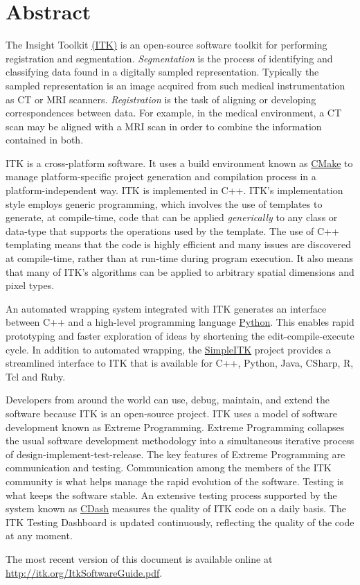 \chapter*{Abstract}
\noindent
The Insight Toolkit \href{http://itk.org}{(ITK)} is an open-source
software toolkit for performing registration and
segmentation. \emph{Segmentation} is the process of identifying and
classifying data found in a digitally sampled
representation. Typically the sampled representation is an image
acquired from such medical instrumentation as CT or MRI
scanners. \emph{Registration} is the task of aligning or developing
correspondences between data. For example, in the medical environment,
a CT scan may be aligned with a MRI scan in order to combine the
information contained in both.

ITK is a cross-platform software. It uses a build environment known as
\href{http://cmake.org}{CMake} to manage platform-specific project
generation and compilation process in a platform-independent way. ITK is
implemented in C++. ITK's implementation style employs generic programming,
which involves the use of templates to generate, at compile-time, code that can
be applied \emph{generically} to any class or data-type that supports the
operations used by the template. The use of C++ templating means that the code
is highly efficient and many issues are discovered at compile-time, rather than
at run-time during program execution. It also means that many of ITK's
algorithms can be applied to arbitrary spatial dimensions and pixel types.

An automated wrapping system integrated with ITK generates an interface between
C++ and a high-level programming language \href{http://www.python.org}{Python}.
This enables rapid prototyping and faster exploration of ideas by shortening the
edit-compile-execute cycle. In addition to automated
wrapping, the \href{http://www.itk.org/Wiki/SimpleITK}{SimpleITK} project
provides a streamlined interface to ITK that is available for C++, Python, Java,
CSharp, R, Tcl and Ruby.

Developers from around the world can use, debug, maintain, and extend the
software because ITK is an open-source project. ITK uses a
model of software development known as Extreme
Programming. Extreme Programming collapses the usual software development
methodology into a simultaneous iterative process of
design-implement-test-release. The key features of Extreme Programming
are communication and testing. Communication among the members of the
ITK community is what helps manage the rapid evolution of the
software. Testing is what keeps the software stable. An
extensive testing process supported by the system known as
\href{http://open.cdash.org/index.php?project=Insight}{CDash}
measures the quality of ITK code on a daily basis. The ITK Testing Dashboard is
updated continuously, reflecting the quality of the code at any moment.

The most recent version of this document is available online at
\url{http://itk.org/ItkSoftwareGuide.pdf}.
